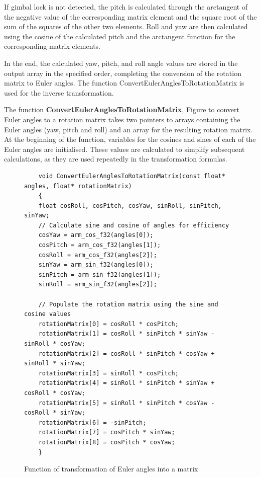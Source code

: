 If gimbal lock is not detected, the pitch is calculated through the arctangent of the negative value of the corresponding matrix element and the square root of the sum of the squares of the other two elements. Roll and yaw are then calculated using the cosine of the calculated pitch and the arctangent function for the corresponding matrix elements.

In the end, the calculated yaw, pitch, and roll angle values are stored in the output array in the specified order, completing the conversion of the rotation matrix to Euler angles. The function ConvertEulerAnglesToRotationMatrix is used for the inverse transformation.



The function \textbf{ConvertEulerAnglesToRotationMatrix}, Figure \citep{codeConvertEulerAnglesToRotationMatrix} to convert Euler angles to a rotation matrix takes two pointers to arrays containing the Euler angles (yaw, pitch and roll) and an array for the resulting rotation matrix. At the beginning of the function, variables for the cosines and sines of each of the Euler angles are initialised. These values are calculated to simplify subsequent calculations, as they are used repeatedly in the transformation formulas.

\begin{figure}[H]
	\centering
	\begin{verbatim}
    void ConvertEulerAnglesToRotationMatrix(const float* angles, float* rotationMatrix)
    {
    float cosRoll, cosPitch, cosYaw, sinRoll, sinPitch, sinYaw;
    // Calculate sine and cosine of angles for efficiency
    cosYaw = arm_cos_f32(angles[0]);
    cosPitch = arm_cos_f32(angles[1]);
    cosRoll = arm_cos_f32(angles[2]);
    sinYaw = arm_sin_f32(angles[0]);
    sinPitch = arm_sin_f32(angles[1]);
    sinRoll = arm_sin_f32(angles[2]);

    // Populate the rotation matrix using the sine and cosine values
    rotationMatrix[0] = cosRoll * cosPitch;
    rotationMatrix[1] = cosRoll * sinPitch * sinYaw - sinRoll * cosYaw;
    rotationMatrix[2] = cosRoll * sinPitch * cosYaw + sinRoll * sinYaw;
    rotationMatrix[3] = sinRoll * cosPitch;
    rotationMatrix[4] = sinRoll * sinPitch * sinYaw + cosRoll * cosYaw;
    rotationMatrix[5] = sinRoll * sinPitch * cosYaw - cosRoll * sinYaw;
    rotationMatrix[6] = -sinPitch;
    rotationMatrix[7] = cosPitch * sinYaw;
    rotationMatrix[8] = cosPitch * cosYaw;
    }
	\end{verbatim}
	\caption{Function of transformation of Euler angles into a matrix}\label{codeConvertEulerAnglesToRotationMatrix}
\end{figure}

